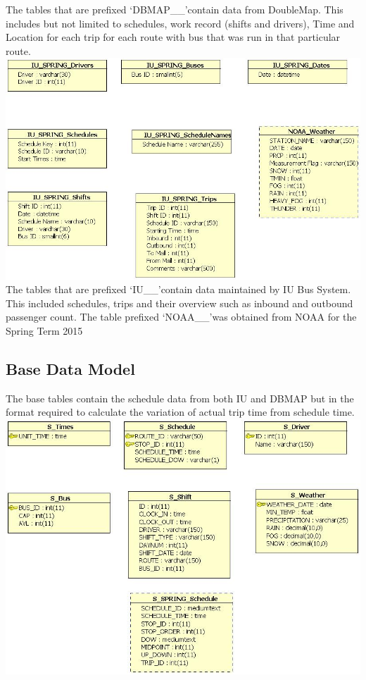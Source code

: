 \documentclass[12pt]{article}\usepackage[]{graphicx}\usepackage[]{color}
\begin{document}
The tables that are prefixed \lq DBMAP\_\_\rq contain data from DoubleMap. This includes but not limited to schedules, work record (shifts and drivers), Time and Location for each trip for each route with bus that was run in that particular route. \\
\includegraphics[scale=0.5]{resources/IU_access}\\[1cm] 
The tables that are prefixed \lq IU\_\_\rq contain data maintained by IU Bus System. This included schedules, trips and their overview such as inbound and outbound passenger count. The table prefixed \lq NOAA\_\_\rq was obtained from NOAA\cite{6} for the 
Spring Term 2015\\
\subsection{Base Data Model}
The base tables contain the schedule data from both IU and DBMAP but in the format required to calculate the variation of actual trip time from schedule time. \\
\includegraphics[scale=0.5]{resources/Source_spring}\\[1cm] 
\end{document}
